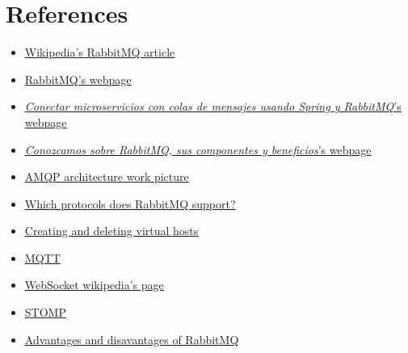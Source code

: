 \documentclass[12pt]{article}
\begin{document}
\section*{References}
\begin{itemize}
    \item \href{https://en.wikipedia.org/wiki/RabbitMQ}{\underline{Wikipedia's RabbitMQ article}}
    \item \href{https://www.rabbitmq.com}{\underline{RabbitMQ's webpage}}
    \item \href{https://www.sdos.es/blog/microservicios-mensajes-spring-rabbitmq}{\underline{\textit{Conectar microservicios con colas de mensajes usando Spring y RabbitMQ}'s webpage}}
    \item \href{https://www.pragma.com.co/academia/lecciones/conozcamos-sobre-rabbitmq-sus-componentes-y-beneficios}{\underline{\textit{Conozcamos sobre RabbitMQ, sus componentes y beneficios}'s webpage}}
    \item \href{https://www.researchgate.net/publication/325119432/figure/fig5/AS:626093459505153@1526283721309/AMQP-architecture-34.png}{\underline{AMQP architecture work picture}}
    \item \href{https://www.rabbitmq.com/protocols.html}{\underline{Which protocols does RabbitMQ support?}}
    \item \href{https://www.rabbitmq.com/vhosts.html}{\underline{Creating and deleting virtual hosts}}
    \item \href{https://www.luisllamas.es/que-es-mqtt-su-importancia-como-protocolo-iot/}{\underline{MQTT}}
    \item \href{https://en.wikipedia.org/wiki/WebSocket}{\underline{WebSocket wikipedia's page}}
    \item \href{http://stomp.github.io}{\underline{STOMP}}
    \item \href{https://programmerclick.com/article/80671335987/}{\underline{Advantages and disavantages of RabbitMQ}}
    \end{itemize}
\end{document}
